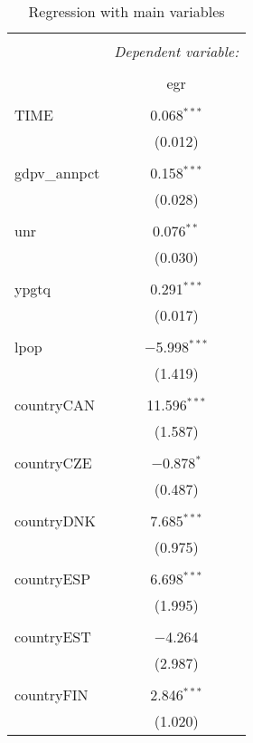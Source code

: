 
\begin{table}[!htbp] \centering 
  \caption{Regression with main variables} 
  \label{} 
\begin{tabular}{@{\extracolsep{5pt}}lc} 
\\[-1.8ex]\hline 
\hline \\[-1.8ex] 
 & \multicolumn{1}{c}{\textit{Dependent variable:}} \\ 
\cline{2-2} 
\\[-1.8ex] & egr \\ 
\hline \\[-1.8ex] 
 TIME & 0.068$^{***}$ \\ 
  & (0.012) \\ 
  & \\ 
 gdpv\_annpct & 0.158$^{***}$ \\ 
  & (0.028) \\ 
  & \\ 
 unr & 0.076$^{**}$ \\ 
  & (0.030) \\ 
  & \\ 
 ypgtq & 0.291$^{***}$ \\ 
  & (0.017) \\ 
  & \\ 
 lpop & $-$5.998$^{***}$ \\ 
  & (1.419) \\ 
  & \\ 
 countryCAN & 11.596$^{***}$ \\ 
  & (1.587) \\ 
  & \\ 
 countryCZE & $-$0.878$^{*}$ \\ 
  & (0.487) \\ 
  & \\ 
 countryDNK & 7.685$^{***}$ \\ 
  & (0.975) \\ 
  & \\ 
 countryESP & 6.698$^{***}$ \\ 
  & (1.995) \\ 
  & \\ 
 countryEST & $-$4.264 \\ 
  & (2.987) \\ 
  & \\ 
 countryFIN & 2.846$^{***}$ \\ 
  & (1.020) \\ 

\end{tabular}
\end{table}
